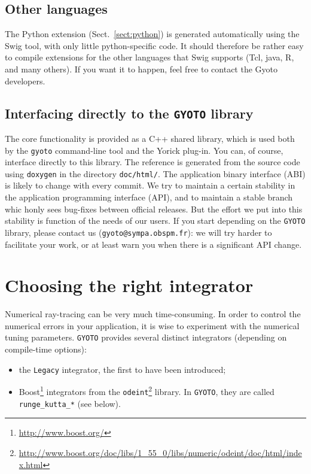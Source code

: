 \documentclass[a4paper,12pt]{article}
\begin{document}
\subsection{Other languages}
\label{sect:swig}

The Python extension (Sect.~\ref{sect:python}) is generated
automatically using the Swig tool, with only little python-specific
code. It should therefore be rather easy to compile extensions for the
other languages that Swig supports (Tcl, java, R, and many others). If
you want it to happen, feel free to contact the Gyoto developers.

\subsection{Interfacing directly to the \texttt{GYOTO} library}

The core functionality is provided as a C++ shared library, which is
used both by the \texttt{gyoto} command-line tool and the Yorick
plug-in. You can, of course, interface directly to this library. The
reference is generated from the source code using \texttt{doxygen} in
the directory \texttt{doc/html/}. The application binary interface
(ABI) is likely to change with every commit. We try to maintain a
certain stability in the application programming interface (API), and
to maintain a stable branch whic honly sees bug-fixes between official
releases. But the effort we put into this stability is function of the
needs of our users. If you start depending on the \texttt{GYOTO}
library, please contact us (\texttt{gyoto@sympa.obspm.fr}): we will
try harder to facilitate your work, or at least warn you when there is
a significant API change.

\section{Choosing the right integrator}
\label{tuning}

Numerical ray-tracing can be very much time-consuming. In order to
control the numerical errors in your application, it is wise to
experiment with the numerical tuning parameters. \texttt{GYOTO}
provides several distinct integrators (depending on compile-time
options):
\begin{itemize}
\item the \texttt{Legacy} integrator, the first to have been introduced;
\item Boost\footnote{\url{http://www.boost.org/}} integrators from the
  \texttt{odeint}\footnote{\url{http://www.boost.org/doc/libs/1_55_0/libs/numeric/odeint/doc/html/index.html}}
  library. In \texttt{GYOTO}, they are called
  \texttt{runge\_kutta\_*} (see below).
\end{itemize}
\end{document}
